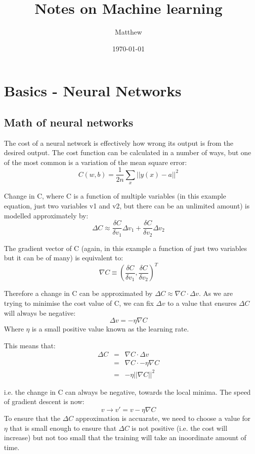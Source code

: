\documentclass[a4paper,12pt]{article}
\begin{document}
\title{Notes on Machine learning}
\author{Matthew}
\date{\today}
\maketitle


\section{Basics - Neural Networks}

\subsection{Math of neural networks}

The cost of a neural network is effectively how wrong its output is from the desired output. The cost function can be calculated in a number of ways, but one of the most common is a variation of the mean square error: $$C(w,b)=\frac{1}{2n}\sum_x||y(x)-a||^2$$

\noindent Change in C, where C is a function of multiple variables (in this example equation, just two variables v1 and v2, but there can be an unlimited amount) is modelled approximately by: $$\Delta C\approx \frac{\delta C}{\delta v_1}\Delta v_1+\frac{\delta C}{\delta v_2}\Delta v_2$$

\noindent The gradient vector of C (again, in this example a function of just two variables but it can be of many) is equivalent to: $$\nabla C\equiv \left(\frac{\delta C}{\delta v_1},\frac{\delta C}{\delta v_2}\right)^T$$

\noindent Therefore a change in C can be approximated by $\Delta C\approx \nabla C \cdot \Delta v$. As we are trying to minimise the cost value of C, we can fix $\Delta v$ to a value that ensures $\Delta C$ will always be negative: $$\Delta v=-\eta \nabla C$$ Where $\eta$ is a small positive value known as the learning rate.

\noindent This means that:
\begin{eqnarray*}
	\Delta C & = & \nabla C\cdot \Delta v \\
	& = & \nabla C \cdot -\eta \nabla C \\
	& = & -\eta || \nabla C ||^2
\end{eqnarray*}

i.e. the change in C can always be negative, towards the local minima. The speed of gradient descent is now:$$v \rightarrow v'=v-\eta \nabla C$$ To ensure that the $\Delta C$ approximation is accuarate, we need to choose a value for $\eta$ that is small enough to ensure that $\Delta C$ is not positive (i.e. the cost will increase) but not too small that the training will take an inoordinate amount of time.
\end{document}
